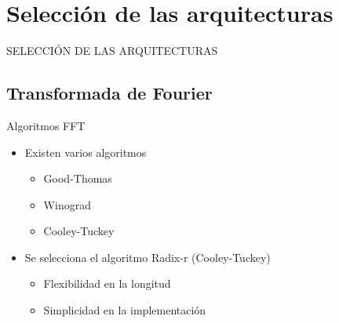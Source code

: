 \section{Selección de las arquitecturas}

\begin{frame}
    \begin{center}
	\Huge SELECCIÓN DE LAS ARQUITECTURAS
	\end{center}
\end{frame}

\subsection{Transformada de Fourier}

\begin{frame}{Algoritmos FFT}
%   
  \begin{itemize}
    \Fontit
    \item<1-> Existen varios algoritmos
    \begin{itemize}
      \Fontitit
      \item<2-> Good-Thomas
      \item<3-> Winograd
      \item<4-> Cooley-Tuckey
    \end{itemize} 
    \item<5-> Se selecciona el algoritmo Radix-r (Cooley-Tuckey)
    \begin{itemize}
      \Fontitit
      \item<6-> Flexibilidad en la longitud
      \item<7-> Simplicidad en la implementación
    \end{itemize}
  \end{itemize}
\end{frame}


